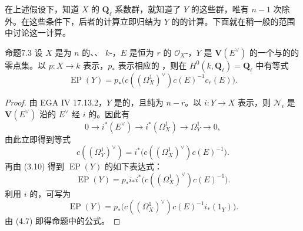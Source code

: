 在上述假设下，知道 $X$ 的 $\mathbf Q_\ell$ 系数群，就知道了 $Y$ 的这些群，唯有 $n-1$ 次除外。在这些条件下，后者的计算立即归结为 $Y$ 的的计算。下面就在稍一般的范围中讨论这一计算。

\begin{SGAresult}{命题}{7.3}
设 $X$ 是为 $n$ 的、、 $k$-，$E$ 是恒为 $r$ 的 $\mathscr O_X$-，$Y$ 是 $\mathbf V(E^\vee)$ 的一个与的的零点集。以 $p:X\to k$ 表示，$p_*$ 表示相应的 ，则在 $H^0(k,\mathbf Q_\ell)=\mathbf Q_\ell$ 中有等式
\[
 \operatorname{EP}(Y)=p_*\bigl(c((\Omega_X^1)^\vee)c(E)^{-1}c_r(E)\bigr).
\]
\end{SGAresult}
\begin{proof}
由 EGA IV 17.13.2，$Y$ 是的，且纯为 $n-r$。以 $i:Y\to X$ 表示，则 $\mathscr N_i$ 是 $\mathbf V(E^\vee)$ 沿的 $E^\vee$ 经 $i$ 的。因此有
\[
 0\longrightarrow i^*(E^\vee)\longrightarrow i^*(\Omega_X^1)
 \longrightarrow\Omega_Y^1\longrightarrow0,\tag{7.3.1}
\]
由此立即得到等式
\[
 c((\Omega_Y^1)^\vee)=i^*\bigl(c((\Omega_X^1)^\vee)c(E)^{-1}\bigr).\tag{7.3.2}
\]
再由 (3.10) 得到 $\operatorname{EP}(Y)$ 的如下表达式：
\[
 \operatorname{EP}(Y)=p_*i_*i^*\bigl(c((\Omega_X^1)^\vee)c(E)^{-1}\bigr).
\]
利用 $i$ 的，可写为
\[
 \operatorname{EP}(Y)=p_*\bigl(c((\Omega_X^1)^\vee)c(E)^{-1}i_*(1_Y)\bigr).
\]
由 (4.7) 即得命题中的公式。
\end{proof}

